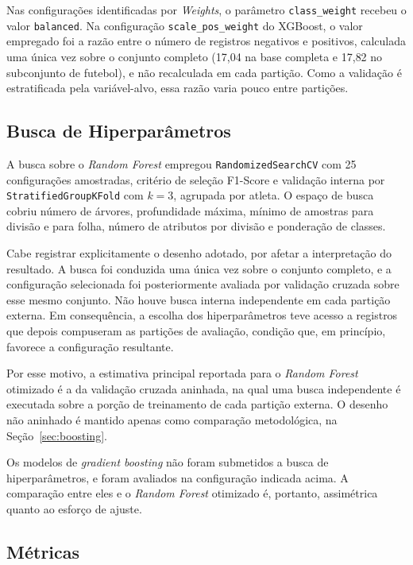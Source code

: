 Nas configurações identificadas por \textit{Weights}, o parâmetro \texttt{class\_weight} recebeu o valor \texttt{balanced}. Na configuração \texttt{scale\_pos\_weight} do XGBoost, o valor empregado foi a razão entre o número de registros negativos e positivos, calculada uma única vez sobre o conjunto completo (17{,}04 na base completa e 17{,}82 no subconjunto de futebol), e não recalculada em cada partição. Como a validação é estratificada pela variável-alvo, essa razão varia pouco entre partições.

\subsection{Busca de Hiperparâmetros}
\label{sec:busca}

A busca sobre o \textit{Random Forest} empregou \texttt{RandomizedSearchCV} com 25 configurações amostradas, critério de seleção F1-Score e validação interna por \texttt{StratifiedGroupKFold} com $k = 3$, agrupada por atleta. O espaço de busca cobriu número de árvores, profundidade máxima, mínimo de amostras para divisão e para folha, número de atributos por divisão e ponderação de classes.

Cabe registrar explicitamente o desenho adotado, por afetar a interpretação do resultado. A busca foi conduzida uma única vez sobre o conjunto completo, e a configuração selecionada foi posteriormente avaliada por validação cruzada sobre esse mesmo conjunto. Não houve busca interna independente em cada partição externa. Em consequência, a escolha dos hiperparâmetros teve acesso a registros que depois compuseram as partições de avaliação, condição que, em princípio, favorece a configuração resultante.

Por esse motivo, a estimativa principal reportada para o \textit{Random Forest} otimizado é a da validação cruzada aninhada, na qual uma busca independente é executada sobre a porção de treinamento de cada partição externa. O desenho não aninhado é mantido apenas como comparação metodológica, na Seção~\ref{sec:boosting}.

Os modelos de \textit{gradient boosting} não foram submetidos a busca de hiperparâmetros, e foram avaliados na configuração indicada acima. A comparação entre eles e o \textit{Random Forest} otimizado é, portanto, assimétrica quanto ao esforço de ajuste.

\subsection{Métricas}


